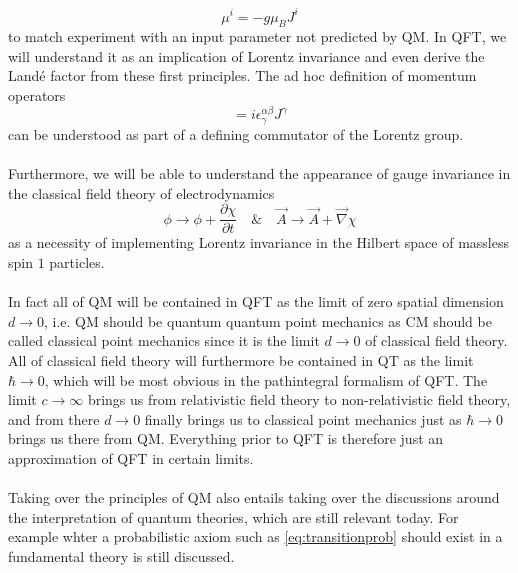 \begin{equation}
	\mu^i = - g \mu_B J^i
\end{equation}
to match experiment with an input parameter not predicted by QM. In QFT, we will understand it as an implication of Lorentz invariance and even derive the Landé factor from these first principles. The ad hoc definition of momentum operators 
\begin{equation}
	[J^\alpha,J^\beta]=i\epsilon^{\alpha \beta}_\gamma J^\gamma
\end{equation}
can be understood as part of a defining commutator of the Lorentz group.\\
\\
Furthermore, we will be able to understand the appearance of gauge invariance in the classical field theory of electrodynamics
\begin{equation}
	\phi \rightarrow\phi + \frac{\partial \chi}{\partial t} \quad \& \quad \vec{A}\rightarrow \vec{A}+\vec{\nabla}\chi
\end{equation}
as a necessity of implementing Lorentz invariance in the Hilbert space of massless spin $1$ particles.\\
\\
In fact all of QM will be contained in QFT as the limit of zero spatial dimension $d\rightarrow0$, i.e. QM should be quantum quantum point mechanics as CM should be called classical point mechanics since it is the limit $d\rightarrow0$ of classical field theory. All of classical field theory will furthermore be contained in QT as the limit $\hbar \rightarrow0$, which will be most obvious in the pathintegral formalism of QFT. The limit $c\rightarrow\infty$ brings us from relativistic field theory to non-relativistic field theory, and from there $d\rightarrow0$ finally brings us to classical point mechanics just as $\hbar \rightarrow 0$ brings us there from QM. Everything prior to QFT is therefore just an approximation of QFT in certain limits.\\
\\
Taking over the principles of QM also entails taking over the discussions around the interpretation of quantum theories, which are still relevant today. For example whter a probabilistic axiom such as \ref{eq:transitionprob} should exist in a fundamental theory is still discussed.\\
\\
